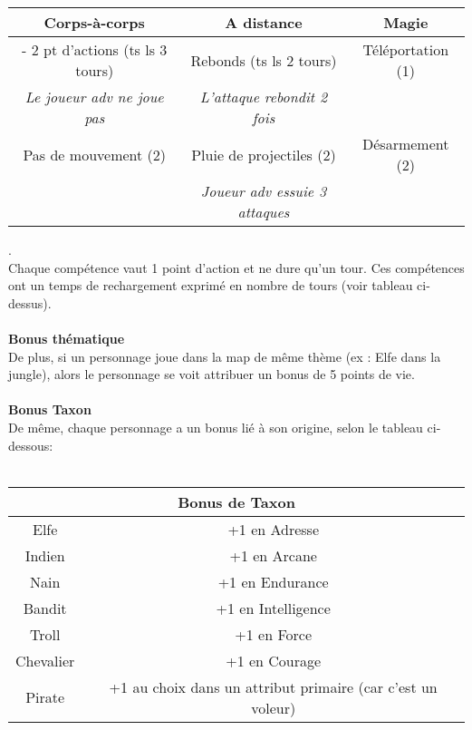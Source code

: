 \documentclass[a4paper,12pt]{report}
\begin{document}
	\begin{tabular}{|c|c|c|} 
		
		\hline
		\textbf{Corps-à-corps} & \textbf{A distance} & \textbf{Magie} \\
		\hline
		- 2 pt d'actions (ts ls 3 tours) & Rebonds (ts ls 2 tours) &Téléportation (1) \\
		\textit{Le joueur adv ne joue pas} & \textit{L'attaque rebondit 2 fois} &  \\
		\hline
		Pas de mouvement (2)& Pluie de projectiles (2) & Désarmement (2) \\
		& \textit{Joueur adv essuie 3 attaques} & \\
		\hline
	\end{tabular}
	. \\
	
	Chaque compétence vaut 1 point d'action et ne dure qu'un tour. Ces compétences ont un temps de rechargement exprimé en nombre de tours (voir tableau ci-dessus). \\ \\
	\textbf{Bonus thématique}\\
	De plus, si un personnage joue dans la map de même thème (ex : Elfe dans la jungle), alors le personnage se voit attribuer un bonus de 5 points de vie. \\ \\
	\textbf{Bonus Taxon} \\ 
	De même, chaque personnage a un bonus lié à son origine, selon le tableau ci-dessous: \\ \\
	
	
	\begin{tabular}{|c|c|}
		\hline
		\multicolumn{2}{|c|}{Bonus de Taxon} \\
		\hline
		Elfe &  +1 en Adresse \\
		\hline
		Indien & +1 en Arcane \\
		\hline
		Nain & +1 en Endurance \\
		\hline
		Bandit & +1 en  Intelligence\\
		\hline
		Troll & +1 en Force \\
		\hline
		Chevalier & +1 en Courage \\
		\hline
		Pirate & +1 au choix dans un attribut primaire (car c'est un voleur)\\
		\hline
	\end{tabular}

	
	
	
	
\end{document}
